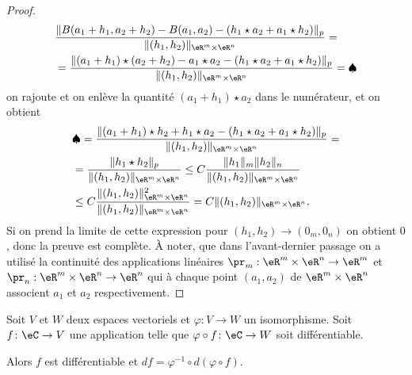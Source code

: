 \begin{proof}
	\begin{equation}
		\begin{aligned}
			 & \frac{\|B(a_1+h_1,a_2+h_2)-B(a_1,a_2)-(h_1\star a_2 + a_1\star h_2)\|_p}{\|(h_1,h_2)\|_{\eR^m\times\eR^n}} =                   \\
			 & = \frac{\|(a_1+h_1)\star(a_2+h_2)-a_1\star a_2-(h_1\star a_2 + a_1\star h_2)\|_p}{\|(h_1,h_2)\|_{\eR^m\times\eR^n}}=\spadesuit
		\end{aligned}
	\end{equation}
	on rajoute et on enlève la quantité \( (a_1+h_1)\star a_2\) dans le numérateur, et on obtient
	\begin{equation}
		\begin{aligned}
			 & \spadesuit= \frac{\|(a_1+h_1)\star h_2+h_1\star a_2-(h_1\star a_2 + a_1\star h_2)\|_p}{\|(h_1,h_2)\|_{\eR^m\times\eR^n}}=      \\
			 & = \frac{\|h_1\star h_2\|_p}{\|(h_1,h_2)\|_{\eR^m\times\eR^n}}\leq C\frac{\|h_1\|_m\|h_2\|_n}{\|(h_1,h_2)\|_{\eR^m\times\eR^n}} \\
			 & \leq C\frac{\|(h_1,h_2)\|^2_{\eR^m\times\eR^n}}{\|(h_1,h_2)\|_{\eR^m\times\eR^n}}= C\|(h_1,h_2)\|_{\eR^m\times\eR^n}.
		\end{aligned}
	\end{equation}
	Si on prend la limite de cette expression pour \( (h_1,h_2)\to (0_m,0_n)\) on obtient \( 0\), donc la preuve est complète. À noter, que dans l'avant-dernier passage on a utilisé la continuité des applications linéaires \( \pr_m:\eR^m\times\eR^n\to \eR^m\) et \( \pr_n: \eR^m\times\eR^n\to \eR^n\) qui à chaque point \( (a_1,a_2)\) de \( \eR^m\times\eR^n\) associent \( a_1\) et \( a_2\) respectivement.
\end{proof}

\begin{proposition}     \label{PropEKLTooSvZjdW}
	Soit \( V\) et \( W\) deux espaces vectoriels et \( \varphi\colon V\to W\) un isomorphisme. Soit \( f\colon \eC\to V\) une application telle que \(\varphi\circ f\colon \eC\to W\) soit différentiable.

	Alors \( f\) est différentiable et \( df=\varphi^{-1}\circ d(\varphi\circ f)\).
\end{proposition}

